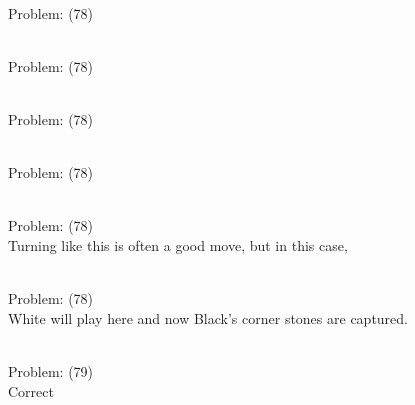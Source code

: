 \documentclass[11pt]{article}
\begin{document}
\begin{minipage}[t]{0.5\textwidth}
  {\centering
  
\\
Problem: (78)\\
  }
\end{minipage}
\begin{minipage}[t]{0.5\textwidth}
  {\centering
  
\\
Problem: (78)\\
  }
\end{minipage}
\begin{minipage}[t]{0.5\textwidth}
  {\centering
  
\\
Problem: (78)\\
  }
\end{minipage}
\begin{minipage}[t]{0.5\textwidth}
  {\centering
  
\\
Problem: (78)\\
  }
\end{minipage}
\begin{minipage}[t]{0.5\textwidth}
  {\centering
  
\\
Problem: (78)\\
Turning like this is often a good move, but in this case,\\
  }
\end{minipage}
\begin{minipage}[t]{0.5\textwidth}
  {\centering
  
\\
Problem: (78)\\
White will play here and now Black's corner stones are captured.\\
  }
\end{minipage}
\begin{minipage}[t]{0.5\textwidth}
  {\centering
  
\\
Problem: (79)\\
Correct\\
  }
\end{minipage}
\end{document}
